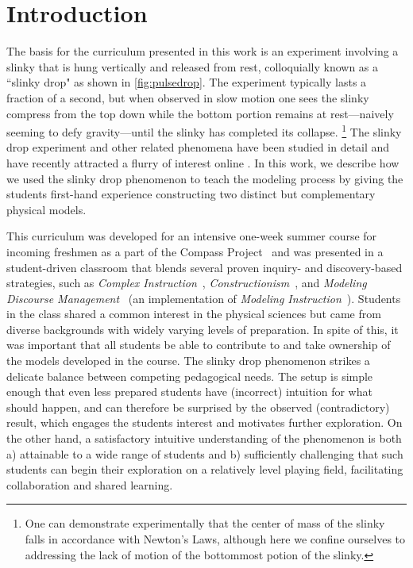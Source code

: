 \documentclass[prb,preprint,superscriptaddress]{revtex4-1}
\newcommand{\FIGpulsedrop}{
\begin{figure}[t]\center
\texttt{[image: figs/FIGpulsedrop.png]}
\caption{\label{fig:pulsedrop} A few frames from a slow motion image of a wave pulse sent down a slinky next to a falling slinky.  Possible a graph of position vs time of the top of the falling slinky and the wave pulse.}
\end{figure}
}
\begin{document}
\maketitle

\section{Introduction}
The basis for the curriculum presented in this work is an experiment involving a
slinky that is hung vertically and released from rest, colloquially known as a ``slinky drop" as shown in \ref{fig:pulsedrop}.
The experiment typically lasts a fraction of a second, but when observed in slow motion one sees the slinky compress from the top down while the bottom portion remains at rest---naively seeming to defy gravity---until the slinky has completed its collapse. 
\footnote{One can demonstrate experimentally that the center of mass of the slinky falls in accordance with Newton's Laws, although here we confine ourselves to addressing the lack of motion of the bottommost potion of the slinky.}
The slinky drop experiment and other related phenomena have
been studied in detail\cite{calkin1993, newburgh1995, graham2001, aguirregabiria2007,unruh2011, cross2012}
and have recently attracted a flurry of interest online \cite{..}.
In this work, we describe how we used the slinky drop phenomenon to teach the modeling process by giving
 the students first-hand experience constructing two distinct but complementary physical models.


This curriculum was developed for an intensive one-week summer course for
incoming freshmen as a part of the Compass Project~\cite{albana2013,Roth2012,drdf2013a,drdf2013b} and was
presented in a student-driven classroom that blends several proven inquiry- and discovery-based strategies, such as \emph{Complex Instruction}~\cite{Cohen1997}, \emph{Constructionism}~\cite{Papert1991}, and \emph{Modeling Discourse Management}~\cite{Desbien2002} (an implementation of \emph{Modeling Instruction}~\cite{Brewe2008}).
Students in the class shared a common interest in the physical sciences but came from diverse backgrounds with widely varying levels of preparation. In spite of this, it was important that all students be able to contribute to and take ownership of the models developed in the course. The slinky drop phenomenon strikes a delicate balance between competing pedagogical needs. The setup is simple enough that even less prepared students have (incorrect) intuition for what should happen, and can therefore be surprised by the observed (contradictory) result, which engages the students interest and motivates further exploration. On the other hand, a satisfactory intuitive %
understanding of the phenomenon is both a) attainable to a wide range of students and b) sufficiently challenging that such students can begin their exploration on a relatively level playing field, facilitating collaboration and shared learning.
\end{document}
